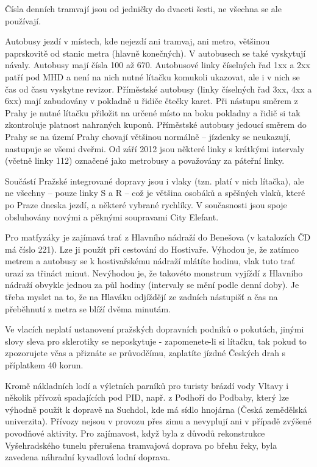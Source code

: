 Čísla denních tramvají jsou od jedničky do dvaceti šesti, ne všechna se ale
používají.

Autobusy jezdí v místech, kde nejezdí ani tramvaj, ani metro, většinou
paprskovitě od stanic metra (hlavně konečných). V autobusech se také vyskytují
návaly. Autobusy mají čísla 100 až 670. Autobusové linky číselných řad 1xx a 2xx
patří pod MHD a není na nich nutné lítačku komukoli ukazovat, ale i v nich se
čas od času vyskytne revizor. Příměstské autobusy (linky číselných řad 3xx, 4xx
a 6xx) mají zabudovány v pokladně u řidiče čtečky karet. Při nástupu směrem z
Prahy je nutné lítačku přiložit na určené místo na boku pokladny a řidič si tak
zkontroluje platnost nahraných kuponů. Příměstské autobusy jedoucí směrem do
Prahy se na území Prahy chovají většinou normálně – jízdenky se neukazují,
nastupuje se všemi dveřmi. Od září 2012 jsou některé linky s krátkými intervaly
(včetně linky 112) označené jako metrobusy a považovány za páteřní linky.

Součástí Pražské integrované dopravy jsou i vlaky (tzn. platí v nich lítačka),
ale ne všechny – pouze linky S a R – což je většina osobáků a spěšných vlaků,
které po Praze dneska jezdí, a některé vybrané rychlíky. V současnosti jsou
spoje obsluhovány novými a pěknými soupravami City Elefant.

Pro matfyzáky je zajímavá trať z Hlavního nádraží do Benešova (v katalozích ČD
má číslo 221). Lze ji použít při cestování do Hostivaře. Výhodou je, že zatímco
metrem a autobusy se k hostivařskému nádraží mlátíte hodinu, vlak tuto trať
urazí za třináct minut. Nevýhodou je, že takovéto monstrum vyjíždí z Hlavního
nádraží obvykle jednou za půl hodiny (intervaly se mění podle denní doby). Je
třeba myslet na to, že na Hlaváku odjíždějí ze zadních nástupišť a čas na
přeběhnutí z metra se blíží dvěma minutám.

Ve vlacích neplatí ustanovení pražských dopravních podniků o pokutách, jinými
slovy sleva pro sklerotiky se neposkytuje - zapomenete-li si lítačku, tak pokud
to zpozorujete včas a přiznáte se průvodčímu, zaplatíte jízdné Českých drah s
příplatkem 40 korun.

Kromě nákladních lodí a výletních parníků pro turisty brázdí vody Vltavy i
několik přívozů spadajících pod PID, např. z Podhoří do Podbaby, který lze
výhodně použít k dopravě na Suchdol, kde má sídlo hnojárna (Česká zemědělská
univerzita). Přívozy nejsou v provozu přes zimu a nevyplují ani v případě
zvýšené povodňové aktivity. Pro zajímavost, když byla z důvodů rekonstrukce
Vyšehradského tunelu přerušena tramvajová doprava po břehu řeky, byla zavedena
náhradní kyvadlová lodní doprava.

